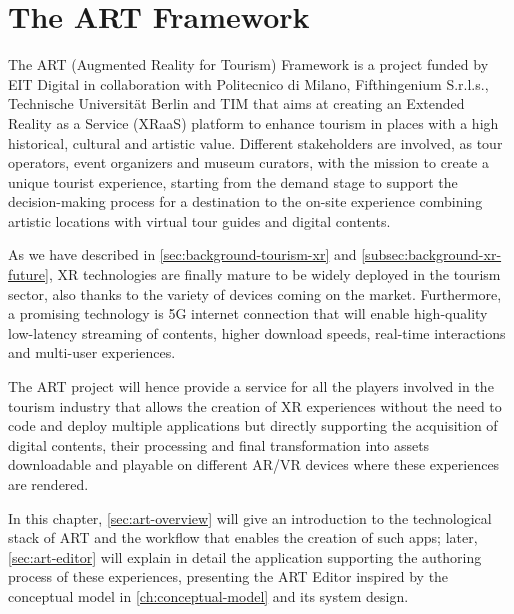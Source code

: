 \chapter{The ART Framework}
\label{ch:art}

The ART (Augmented Reality for Tourism) Framework is a project funded by EIT Digital in collaboration with Politecnico di Milano, Fifthingenium S.r.l.s., Technische Universität Berlin and TIM that aims at creating an Extended Reality as a Service (XRaaS) platform to enhance tourism in places with a high historical, cultural and artistic value. Different stakeholders are involved, as tour operators, event organizers and museum curators, with the mission to create a unique tourist experience, starting from the demand stage to support the decision-making process for a destination to the on-site experience combining artistic locations with virtual tour guides and digital contents.

As we have described in \autoref{sec:background-tourism-xr} and \autoref{subsec:background-xr-future}, \gls{XR} technologies are finally mature to be widely deployed in the tourism sector, also thanks to the variety of devices coming on the market. Furthermore, a promising technology is 5G internet connection that will enable high-quality low-latency streaming of contents, higher download speeds, real-time interactions and multi-user experiences.

The ART project will hence provide a service for all the players involved in the tourism industry that allows the creation of \gls{XR} experiences without the need to code and deploy multiple applications but directly supporting the acquisition of digital contents, their processing and final transformation into assets downloadable and playable on different \gls{AR}/\gls{VR} devices where these experiences are rendered.

In this chapter, \autoref{sec:art-overview} will give an introduction to the technological stack of ART and the workflow that enables the creation of such apps; later, \autoref{sec:art-editor} will explain in detail the application supporting the authoring process of these experiences, presenting the ART Editor inspired by the conceptual model in \autoref{ch:conceptual-model} and its system design.


